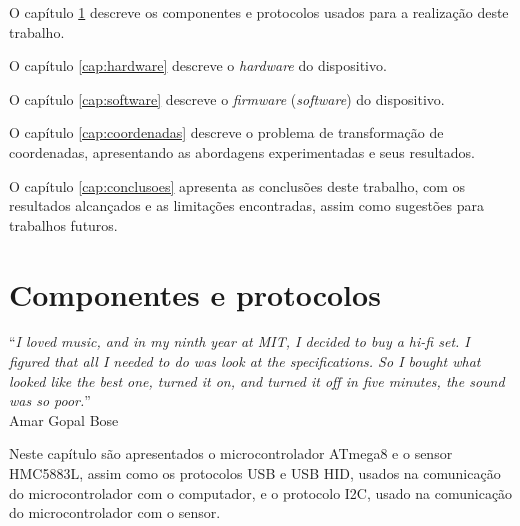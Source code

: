 \documentclass[brazil,pagestart=firstchapter]{abnt}
\begin{document}
O capítulo \ref{cap:componentes_e_protocolos} descreve os componentes e
protocolos usados para a realização deste trabalho.

O capítulo \ref{cap:hardware} descreve o \textit{hardware} do dispositivo.

O capítulo \ref{cap:software} descreve o \textit{firmware}
(\textit{software}) do dispositivo.

O capítulo \ref{cap:coordenadas} descreve o problema de transformação de
coordenadas, apresentando as abordagens experimentadas e seus resultados.

O capítulo \ref{cap:conclusoes} apresenta as conclusões deste
trabalho, com os resultados alcançados e as limitações encontradas, assim
como sugestões para trabalhos futuros.



%
%



\chapter{Componentes e protocolos}
\label{cap:componentes_e_protocolos}


\vfill{}
\begin{flushright}{}
``\emph{I loved music, and in my ninth year at MIT, I decided to buy a hi-fi
set. I figured that all I needed to do was look at the specifications. So I
bought what looked like the best one, turned it on, and turned it off in
five minutes, the sound was so poor.}''\\
{\small Amar Gopal Bose}
\end{flushright}{\small \par}
\vfill{}

Neste capítulo são apresentados o microcontrolador ATmega8 e o sensor
HMC5883L, assim como os protocolos \acs{USB} e \acs{USB} \acs{HID}, usados
na comunicação do microcontrolador com o computador, e o protocolo
\acs{I2C}, usado na comunicação do microcontrolador com o sensor.
\newpage
\end{document}
